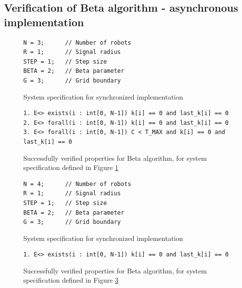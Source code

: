 \subsection{Verification of Beta algorithm - asynchronous implementation}
\begin{figure}[H]
\caption{System specification for synchronized implementation}
\label{fig:algorithm_asynchronous_system}
\begin{lstlisting}[style=code]
N = 3;      // Number of robots
R = 1;      // Signal radius
STEP = 1;   // Step size
BETA = 2;   // Beta parameter
G = 3;      // Grid boundary
\end{lstlisting}
\end{figure}

\begin{figure}[H]
\caption{Successfully verified properties for Beta algorithm, for system specification defined in Figure \ref{fig:algorithm_asynchronous_system}}
\label{fig:algorithm_asynchronous_properties}
\begin{lstlisting}[style=code]
1. E<> exists(i : int[0, N-1]) k[i] == 0 and last_k[i] == 0
2. E<> forall(i : int[0, N-1]) k[i] == 0 and last_k[i] == 0
3. E<> forall(i : int[0, N-1]) C < T_MAX and k[i] == 0 and last_k[i] == 0 
\end{lstlisting}    
\end{figure}

\begin{figure}[H]
\caption{System specification for synchronized implementation}
\label{fig:algorithm_asynchronous_system_2}
\begin{lstlisting}[style=code]
N = 4;      // Number of robots
R = 1;      // Signal radius
STEP = 1;   // Step size
BETA = 2;   // Beta parameter
G = 3;      // Grid boundary
\end{lstlisting}
\end{figure}

\begin{figure}[H]
\caption{Successfully verified properties for Beta algorithm, for system specification defined in Figure \ref{fig:algorithm_asynchronous_system_2}}
\label{fig:algorithm_asynchronous_properties_2}
\begin{lstlisting}[style=code]
1. E<> exists(i : int[0, N-1]) k[i] == 0 and last_k[i] == 0
\end{lstlisting}    
\end{figure}

